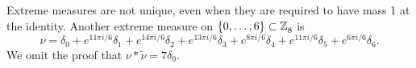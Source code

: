 \begin{rem}
Extreme measures are not unique, even when they are required to have mass 1 at the identity.
 Another extreme measure on $\{0,\dots,6\}\subset \texttt{$\mathbb Z_{8}^{\,}$}$
is \[
\nu=\delta_0+
e^{11\pi i/6}\delta_1+
e^{14\pi i/6} \delta_2
+e^{13\pi i/6}\delta_3
+e^{8\pi i/6}\delta_4
+e^{11\pi i/6}\delta_5
+e^{6\pi i/6}\delta_6.
\]
We omit the proof that $\nu*\widetilde{\nu} =7\delta_0.$

\end{rem}

